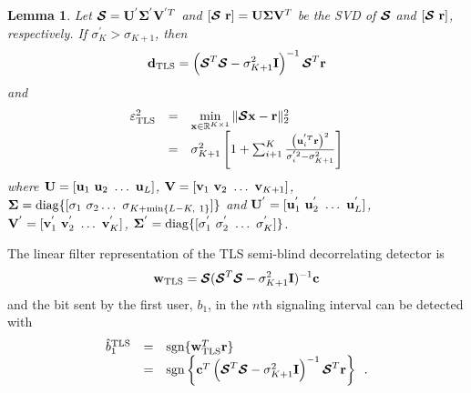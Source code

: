 \documentclass[10pt,fleqn,twocolumn]{IEEEtran}
\newtheorem{lemma}{Lemma}
\newcommand{\br}{{\mathbf r}}
\newcommand{\bc}{{\bf c}}
\newcommand{\bd}{{\bf d}}
\newcommand{\bn}{{\bf n}}
\newcommand{\bu}{{\bf u}}
\newcommand{\bv}{{\bf v}}
\newcommand{\bw}{{\bf w}}
\newcommand{\bx}{{\bf x}}
\newcommand{\bI}{{\bf I}}
\newcommand{\bU}{{\bf U}}
\newcommand{\bV}{{\bf V}}
\newcommand{\bcS}{{\mbox {\boldmath ${\cal S}$}}}
\begin{document}
\begin{lemma}\cite{Huff91} Let $\bcS=\bU^{'}\mathbf{\Sigma}^{'}\bV^{'T}$ and
$[\bcS\ \br]=\bU\mathbf{\Sigma}\bV^T$ be the SVD of $\bcS$ and
$[\bcS\ \br]$, respectively. If $\sigma_K^{'}
> \sigma_{K+1}$, then
\begin{equation}
\bd_{\rm TLS} = \left(\bcS^T\bcS-\sigma_{K+1}^2\bI\right)^{-1}\bcS^T\br
\end{equation}
and
\begin{equation}
\begin{array}{rcl}
\varepsilon_{\rm TLS}^{2}&=&\min\limits_{\bx\in \mathbb{R}^{K\times
1}}\|\bcS\bx-\br\|_2^2 \\
 &=& \sigma_{K+1}^2\left[1+\sum_{i+1}^{K}\frac{\left(\bu_i^{'T}\br\right)^2}
{\sigma_i^{'2}-\sigma_{K+1}^2}\right]
\end{array}
\end{equation}
where $\bU=[\bu_1\ \bu_2\ \ldots\ \bu_L]$, $\bV=[\bv_1\
\bv_2\ \ldots\ \bv_{K+1}]$, $\mathbf{\Sigma}={\rm diag}\{[\sigma_1\
\sigma_2 \ldots\ \sigma_{K+\min\limits\{L-K,\ 1\}}]\}$ and
$\bU^{'}=[\bu_1^{'}\ \bu_2^{'}\ \ldots\ \bu_L^{'}]$,
 $\bV^{'}=[\bv_1^{'}\ \bv_2^{'}\ \ldots\ \bv_{K}^{'}]$,
 $\mathbf{\Sigma}^{'}={\rm diag}\{[\sigma_1^{'}\ \sigma_2^{'}\ \ldots\ \sigma_K^{'}]\}$.
\end{lemma}


The linear filter representation of the TLS semi-blind decorrelating
detector is
\begin{equation}
\bw_{\rm TLS} = \bcS(\bcS^T\bcS-\sigma_{K+1}^2\bI)^{-1}\bc
\end{equation}
and the bit sent by the first user, $b_1$, in the $n$th signaling interval
can be detected with
\begin{equation}
\begin{array}{rcl}
\hat{b}^{\rm TLS}_{1}&=&\mbox{sgn}\{\bw_{\rm TLS}^T\br\}\\
 &=&\mbox{sgn}\left\{ \bc^T\left(\bcS^T\bcS-\sigma_{K+1}^2\bI\right)^{-1}
 \bcS^T\br\right\} \enspace .
\end{array}
\label{b_TLS}
\end{equation}
\end{document}
